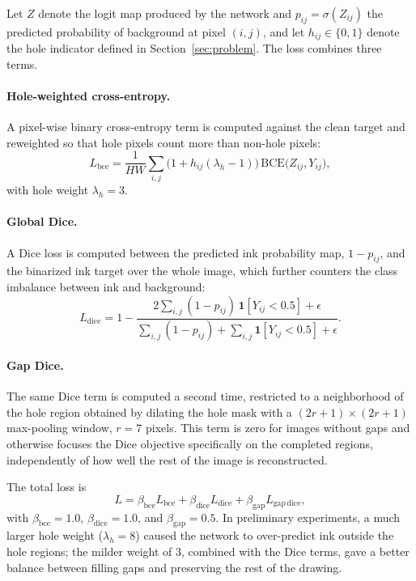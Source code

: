 \documentclass[preprint,12pt]{elsarticle}
\begin{document}
Let $Z$ denote the logit map produced by the network and $p_{ij} = \sigma(Z_{ij})$ the predicted probability of background at pixel $(i,j)$, and let $h_{ij} \in \{0,1\}$ denote the hole indicator defined in Section~\ref{sec:problem}. The loss combines three terms.

\paragraph{Hole-weighted cross-entropy.} A pixel-wise binary cross-entropy term is
computed against the clean target and reweighted so that hole pixels count more
than non-hole pixels:
\begin{equation}
  L_{\mathrm{bce}} = \frac{1}{HW} \sum_{i,j} \bigl(1 + h_{ij}(\lambda_h - 1)\bigr)
  \,\mathrm{BCE}\bigl(Z_{ij}, Y_{ij}\bigr),
\end{equation}
with hole weight $\lambda_h = 3$.

\paragraph{Global Dice.} A Dice loss \citep{milletari2016vnet} is computed between
the predicted ink probability map, $1 - p_{ij}$, and the binarized ink target over
the whole image, which further counters the class imbalance between ink and
background:
\begin{equation}
  L_{\mathrm{dice}} = 1 - \frac{2 \sum_{i,j} (1-p_{ij})\, \mathbf{1}[Y_{ij}<0.5] + \epsilon}
  {\sum_{i,j} (1-p_{ij}) + \sum_{i,j} \mathbf{1}[Y_{ij}<0.5] + \epsilon}.
\end{equation}

\paragraph{Gap Dice.} The same Dice term is computed a second time, restricted to a
neighborhood of the hole region obtained by dilating the hole mask with a
$(2r+1)\times(2r+1)$ max-pooling window, $r=7$ pixels. This term is zero for images
without gaps and otherwise focuses the Dice objective specifically on the completed
regions, independently of how well the rest of the image is reconstructed.

The total loss is
\begin{equation}
  L = \beta_{\mathrm{bce}} L_{\mathrm{bce}} + \beta_{\mathrm{dice}} L_{\mathrm{dice}}
  + \beta_{\mathrm{gap}} L_{\mathrm{gap\,dice}},
\end{equation}
with $\beta_{\mathrm{bce}} = 1.0$, $\beta_{\mathrm{dice}} = 1.0$, and
$\beta_{\mathrm{gap}} = 0.5$. In preliminary experiments, a much larger hole weight
($\lambda_h = 8$) caused the network to over-predict ink outside the hole regions;
the milder weight of 3, combined with the Dice terms, gave a better balance between
filling gaps and preserving the rest of the drawing.
\end{document}

